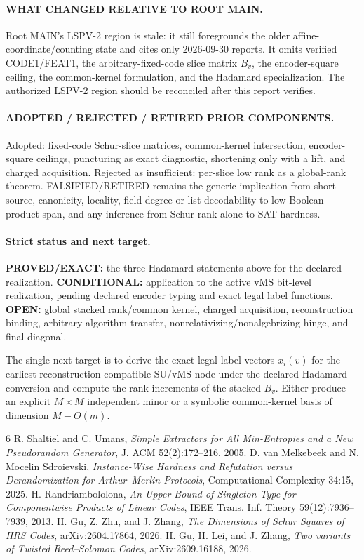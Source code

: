 \documentclass[11pt]{article}
\begin{document}
\paragraph{WHAT CHANGED RELATIVE TO ROOT MAIN.}
Root MAIN's LSPV-2 region is stale: it still foregrounds the older affine-coordinate/counting state and cites only 2026-09-30 reports. It omits verified CODE1/FEAT1, the arbitrary-fixed-code slice matrix \(B_v\), the encoder-square ceiling, the common-kernel formulation, and the Hadamard specialization. The authorized LSPV-2 region should be reconciled after this report verifies.

\paragraph{ADOPTED / REJECTED / RETIRED PRIOR COMPONENTS.}
Adopted: fixed-code Schur-slice matrices, common-kernel intersection, encoder-square ceilings, puncturing as exact diagnostic, shortening only with a lift, and charged acquisition. Rejected as insufficient: per-slice low rank as a global-rank theorem. FALSIFIED/RETIRED remains the generic implication from short source, canonicity, locality, field degree or list decodability to low Boolean product span, and any inference from Schur rank alone to SAT hardness.

\paragraph{Strict status and next target.}
\textbf{PROVED/EXACT:} the three Hadamard statements above for the declared realization. \textbf{CONDITIONAL:} application to the active vMS bit-level realization, pending declared encoder typing and exact legal label functions. \textbf{OPEN:} global stacked rank/common kernel, charged acquisition, reconstruction binding, arbitrary-algorithm transfer, nonrelativizing/nonalgebrizing hinge, and final diagonal.

The single next target is to derive the exact legal label vectors \(x_i(v)\) for the earliest reconstruction-compatible SU/vMS node under the declared Hadamard conversion and compute the rank increments of the stacked \(B_v\). Either produce an explicit \(M\times M\) independent minor or a symbolic common-kernel basis of dimension \(M-O(m)\).

\begin{thebibliography}{6}
 R. Shaltiel and C. Umans, \emph{Simple Extractors for All Min-Entropies and a New Pseudorandom Generator}, J. ACM 52(2):172--216, 2005.
 D. van Melkebeek and N. Mocelin Sdroievski, \emph{Instance-Wise Hardness and Refutation versus Derandomization for Arthur--Merlin Protocols}, Computational Complexity 34:15, 2025.
 H. Randriambololona, \emph{An Upper Bound of Singleton Type for Componentwise Products of Linear Codes}, IEEE Trans. Inf. Theory 59(12):7936--7939, 2013.
 H. Gu, Z. Zhu, and J. Zhang, \emph{The Dimensions of Schur Squares of HRS Codes}, arXiv:2604.17864, 2026.
 H. Gu, H. Lei, and J. Zhang, \emph{Two variants of Twisted Reed--Solomon Codes}, arXiv:2609.16188, 2026.
\end{thebibliography}
\end{document}
